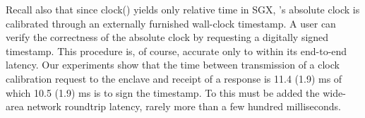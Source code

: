 Recall also that since clock() yields only relative time in SGX, \tc's absolute clock is calibrated through an externally furnished wall-clock timestamp.
A user can verify the correctness of the \encname absolute clock by requesting a digitally signed timestamp.
This procedure is, of course, accurate only to within its end-to-end latency. Our experiments show that the time between \medname transmission of a clock calibration request to the enclave and receipt of a response is
11.4 (1.9) ms of which 10.5 (1.9) ms is to 
sign the timestamp.
To this must be added the wide-area network roundtrip latency, rarely more than a few hundred milliseconds. %
